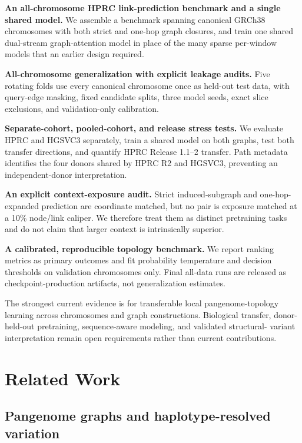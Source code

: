 \IfFileExists{ws-procs11x85.cls}{\worldscientificclasstrue\documentclass{ws-procs11x85}}{\worldscientificclassfalse\documentclass[11pt]{article}\usepackage[margin=1in]{geometry}}
\begin{document}
\begin{itemlist}
\item \textbf{An all-chromosome HPRC link-prediction benchmark and a single
shared model.} We assemble a benchmark spanning canonical GRCh38 chromosomes with both
strict and one-hop graph closures, and train one shared dual-stream
graph-attention model in place of the many sparse per-window models that an
earlier design required.
\item \textbf{All-chromosome generalization with explicit leakage audits.}
Five rotating folds use every canonical chromosome once as held-out test data,
with query-edge masking, fixed candidate splits, three model seeds, exact slice
exclusions, and validation-only calibration.
\item \textbf{Separate-cohort, pooled-cohort, and release stress tests.} We
evaluate HPRC and HGSVC3 separately, train a shared model on both graphs, test
both transfer directions, and quantify HPRC Release 1.1--2 transfer. Path
metadata identifies the four donors shared by HPRC R2 and HGSVC3, preventing an
independent-donor interpretation.
\item \textbf{An explicit context-exposure audit.} Strict induced-subgraph and
one-hop-expanded prediction are coordinate matched, but no pair is exposure
matched at a 10\% node/link caliper. We therefore treat them as distinct
pretraining tasks and do not claim that larger context is intrinsically
superior.
\item \textbf{A calibrated, reproducible topology benchmark.} We report ranking
metrics as primary outcomes and fit probability temperature and decision
thresholds on validation chromosomes only. Final all-data runs are released as
checkpoint-production artifacts, not generalization estimates.
\end{itemlist}

The strongest current evidence is for transferable local pangenome-topology
learning across chromosomes and graph constructions. Biological transfer,
donor-held-out pretraining, sequence-aware modeling, and validated structural-
variant interpretation remain open requirements rather than current
contributions.

\section{Related Work}

\subsection{Pangenome graphs and haplotype-resolved variation}
\end{document}

